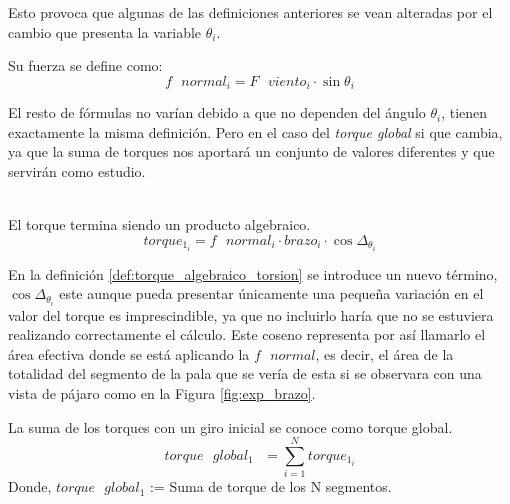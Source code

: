Esto provoca que algunas de las definiciones anteriores se vean alteradas por el cambio que presenta la variable $\theta_i$.\\

 

 \begin{definicion}
  Su fuerza se define como:
  $$ f \text{ } normal_i = F \text{ } viento_i \cdot \sin{\theta_i}$$
  \label{def:fuerza_normal_torsion}
 \end{definicion}

El resto de fórmulas no varían debido a que no dependen del ángulo $\theta_i$, tienen exactamente la misma definición. Pero en el caso del \textit{torque global} si que cambia, ya que la suma de torques nos aportará un conjunto de valores diferentes y que servirán como estudio. \\\\

  \begin{definicion}
  El torque termina siendo un producto algebraico.
 $$ torque_{1_i} = f \text{ } normal_i \cdot brazo_i \cdot \cos{\Delta_{\theta_{i}}}$$
 \label{def:torque_algebraico_torsion}
 \end{definicion}
 
 En la definición \ref{def:torque_algebraico_torsion} se introduce un nuevo término, $ \cos{\Delta_{\theta_{i}}} $ este aunque pueda presentar únicamente una pequeña variación en el valor del torque es imprescindible, ya que no incluirlo haría que no se estuviera realizando correctamente el cálculo. Este coseno representa por así llamarlo el área efectiva donde se está aplicando la $ f \text{ } normal $, es decir, el área de la totalidad del segmento de la pala que se vería de esta si se observara con una vista de pájaro como en la Figura \ref{fig:exp_brazo}. \\

\begin{definicion}
 La suma de los torques con un giro inicial se conoce como torque global.
 $$ torque \text{ } global_1 \text{ } = \sum_{i=1}^{N} torque_{1_i} $$
Donde,
\centering $torque \text{ } global_1$ := Suma de torque de los N segmentos.
 \label{def:torque_global_1}
\end{definicion}






















